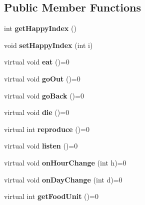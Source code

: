 \subsection*{Public Member Functions}
\begin{DoxyCompactItemize}
\item 
\mbox{\label{class_emotion_animal_ae075ddea4c14459fc47dd8fb6b986676}} 
int {\bfseries get\+Happy\+Index} ()
\item 
\mbox{\label{class_emotion_animal_af269fd4dc612625c77ce55667502a092}} 
void {\bfseries set\+Happy\+Index} (int i)
\item 
\mbox{\label{class_emotion_animal_ad112df6f803ac02b701558c4765c8dc9}} 
virtual void {\bfseries eat} ()=0
\item 
\mbox{\label{class_emotion_animal_a4961194875c3c286808f2aa2a23eec3d}} 
virtual void {\bfseries go\+Out} ()=0
\item 
\mbox{\label{class_emotion_animal_aee6f0e1c1bf618172d59a79fe1630190}} 
virtual void {\bfseries go\+Back} ()=0
\item 
\mbox{\label{class_emotion_animal_ad89a20ca48b79c9fc5681d6b5a811330}} 
virtual void {\bfseries die} ()=0
\item 
\mbox{\label{class_emotion_animal_a499ff4778d256bac4cc3604ff764e371}} 
virtual int {\bfseries reproduce} ()=0
\item 
\mbox{\label{class_emotion_animal_a9740606110f30a35c2a64fda0200ea6f}} 
virtual void {\bfseries listen} ()=0
\item 
\mbox{\label{class_emotion_animal_a28e538a0afde42d04fc68c3da53bffbf}} 
virtual void {\bfseries on\+Hour\+Change} (int h)=0
\item 
\mbox{\label{class_emotion_animal_a4c065f7aa86b04e35a5caf5c5753ae42}} 
virtual void {\bfseries on\+Day\+Change} (int d)=0
\item 
\mbox{\label{class_emotion_animal_adcba3f01ed5c6f0ddde576b2fffd5571}} 
virtual int {\bfseries get\+Food\+Unit} ()=0
\end{DoxyCompactItemize}
